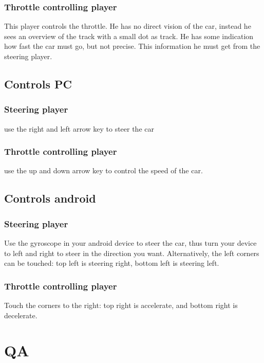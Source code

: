 \documentclass{article}
\begin{document}
\subsubsection{Throttle controlling player}
This player controls the throttle. He has no direct vision of the car, instead he sees an overview of the track with a small dot as track. He has some indication how fast the car must go, but not precise. This information he must get from the steering player.
\subsection{Controls PC}
\subsubsection{Steering player}
use the right and left arrow key to steer the car
\subsubsection{Throttle controlling player}
use the up and down arrow key to control the speed of the car.
\subsection{Controls android}
\subsubsection{Steering player}
Use the gyroscope in your android device to steer the car, thus turn your device to left and right to steer in the direction you want. Alternatively, the left corners can be touched: top left is steering right, bottom left is steering left.
\subsubsection{Throttle controlling player}
Touch the corners to the right: top right is accelerate, and bottom right is decelerate.

\section{QA}
\Ans{}
\Ans{}
\Ans{}
\Ans{}
\Ans{}
\Ans{}
\Ans{}
\Ans{}
\Ans{}
\Ans{}
\Ans{}
\Ans{}
\Ans{}
\Ans{}
\Ans{}
\Ans{}
\end{document}

